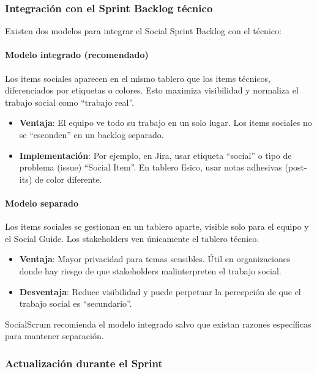 \subsubsection{Integración con el Sprint Backlog técnico}

Existen dos modelos para integrar el Social Sprint Backlog con el técnico:

\paragraph{Modelo integrado (recomendado)}

Los items sociales aparecen en el mismo tablero que los items técnicos, diferenciados por etiquetas o colores. Esto maximiza visibilidad y normaliza el trabajo social como ``trabajo real''.

\begin{itemize}
    \item \textbf{Ventaja}: El equipo ve todo su trabajo en un solo lugar. Los items sociales no se ``esconden'' en un backlog separado.
    \item \textbf{Implementación}: Por ejemplo, en Jira, usar etiqueta ``social'' o tipo de problema (issue) ``Social Item''. En tablero físico, usar notas adhesivas (post-its) de color diferente.
\end{itemize}

\paragraph{Modelo separado}

Los items sociales se gestionan en un tablero aparte, visible solo para el equipo y el Social Guide. Los stakeholders ven únicamente el tablero técnico.

\begin{itemize}
    \item \textbf{Ventaja}: Mayor privacidad para temas sensibles. Útil en organizaciones donde hay riesgo de que stakeholders malinterpreten el trabajo social.
    \item \textbf{Desventaja}: Reduce visibilidad y puede perpetuar la percepción de que el trabajo social es ``secundario''.
\end{itemize}

SocialScrum recomienda el modelo integrado salvo que existan razones específicas para mantener separación.

\subsubsection{Actualización durante el Sprint}

